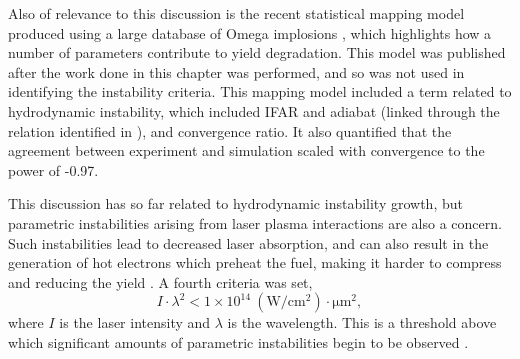Also of relevance to this discussion is the recent statistical mapping model produced using a large database of Omega implosions \cite{Lees2021}, which highlights how a number of parameters contribute to yield degradation. This model was published after the work done in this chapter was performed, and so was not used in identifying the instability criteria. This mapping model included a term related to hydrodynamic instability, which included IFAR and adiabat (linked through the relation identified in \cite{Goncharov2014}), and convergence ratio. It also quantified that the agreement between experiment and simulation scaled with convergence to the power of -0.97.


This discussion has so far related to hydrodynamic instability growth, but parametric instabilities arising from laser plasma interactions are also a concern. Such instabilities lead to decreased laser absorption, and can also result in the generation of hot electrons which preheat the fuel, making it harder to compress and reducing the yield \cite{Rosenberg2018, Yaakobi2000}. A fourth criteria was set,
\begin{equation} I \cdot \lambda^2 < 1 \times 10^{14} \: (\unit{\watt\per\centi\meter\squared}) \cdot \unit{\micro\meter\squared}, \end{equation}
where $I$ is the laser intensity and $\lambda$ is the wavelength. This is a threshold above which significant amounts of parametric instabilities begin to be observed \cite{Montgomery2016}.


